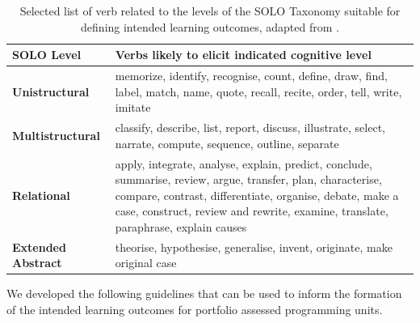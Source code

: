 \begin{table}[p]
	\renewcommand{\arraystretch}{1.6}
	\centering

	\caption{Selected list of verb related to the levels of the SOLO Taxonomy suitable for defining intended learning outcomes, adapted from \citet{Biggs:2007}.}
 	\label{tbl:solo_verbs}
 	\footnotesize
    \begin{tabular}{lp{10cm}}
    SOLO Level        & Verbs likely to elicit indicated cognitive level \\
    \hline
    \textbf{Unistructural}     & memorize, identify, recognise, count, define, draw, find, label, match, name, quote, recall, recite, order, tell, write, imitate\\
    \textbf{Multistructural}   & classify, describe, list, report, discuss, illustrate, select, narrate, compute, sequence, outline, separate\\
    \textbf{Relational}        & apply, integrate, analyse, explain, predict, conclude, summarise, review, argue, transfer, plan, characterise, compare, contrast, differentiate, organise, debate, make a case, construct, review and rewrite, examine, translate, paraphrase, explain causes \\
    \textbf{Extended Abstract} & theorise, hypothesise, generalise, invent, originate, make original case\\
    \end{tabular}
\end{table}

We developed the following guidelines that can be used to inform the formation of the intended learning outcomes for portfolio assessed programming units.

%
% 
%
%
%

